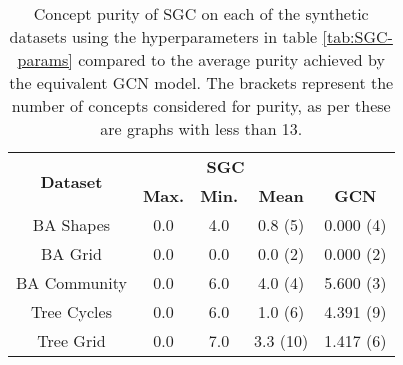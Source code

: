 \begin{table}
    \centering
    \begin{tabular}{c|ccc|c}
        \multirow{2}{*}{\textbf{Dataset}} &
        \multicolumn{3}{c}{\textbf{SGC}} & \\
        & \textbf{Max.} & \textbf{Min.} & \textbf{Mean} & \multirow{-2}{*}{\textbf{GCN}}\\
        \midrule
        BA Shapes       & 0.0 & 4.0 & 0.8 (5) & 0.000 (4) \\
        BA Grid         & 0.0 & 0.0 & 0.0 (2) & 0.000 (2) \\
        BA Community    & 0.0 & 6.0 & 4.0 (4) & 5.600 (3) \\
        Tree Cycles     & 0.0 & 6.0 & 1.0 (6) & 4.391 (9) \\
        Tree Grid       & 0.0 & 7.0 & 3.3 (10) & 1.417 (6) \\
    \end{tabular}
    \caption{Concept purity of SGC on each of the synthetic datasets using the hyperparameters in table \ref{tab:SGC-params} compared to the average purity achieved by the equivalent GCN model. The brackets represent the number of concepts considered for purity, as per  these are graphs with less than 13.}
    \label{tab:SGC-purity}
\end{table}

